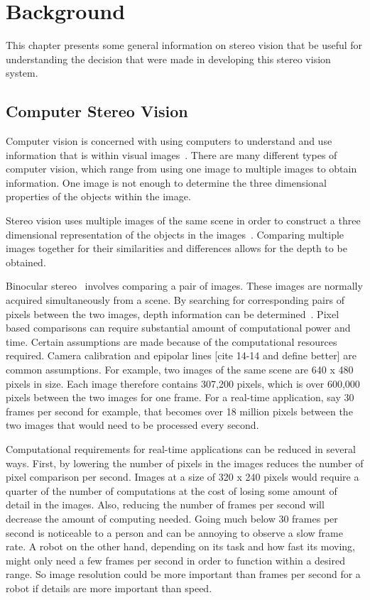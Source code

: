 \chapter{Background}
\label{bckgrnd}

This chapter presents some general information on stereo vision that be useful for understanding the decision that were made in developing this stereo vision system.

\section{Computer Stereo Vision}

Computer vision is concerned with using computers to understand and use information that is within visual images~\cite{computerVision}. There are many different types of computer vision, which range from using one image to multiple images to obtain information. One image is not enough to determine the three dimensional properties of the objects within the image.

Stereo vision uses multiple images of the same scene in order to construct a three dimensional representation of the objects in the images~\cite{stereoVision}. Comparing multiple images together for their similarities and differences allows for the depth to be obtained.

Binocular stereo~\cite{binocularStereo} involves comparing a pair of images. These images are normally acquired simultaneously from a scene. By searching for corresponding pairs of pixels between the two images, depth information can be determined~\cite{binocularStereo}. Pixel based comparisons can require substantial amount of computational power and time. Certain assumptions are made because of the computational resources required. Camera calibration and epipolar lines [cite 14-14 and define better] are common assumptions. For example, two images of the same scene are 640 x 480 pixels in size. Each image therefore contains 307,200 pixels, which is over 600,000 pixels between the two images for one frame. For a real-time application, say 30 frames per second for example, that becomes over 18 million pixels between the two images that would need to be processed every second.

Computational requirements for real-time applications can be reduced in several ways. First, by lowering the number of pixels in the images reduces the number of pixel comparison per second. Images at a size of 320 x 240 pixels would require a quarter of the number of computations at the cost of losing some amount of detail in the images. Also, reducing the number of frames per second will decrease the amount of computing needed. Going much below 30 frames per second is noticeable to a person and can be annoying to observe a slow frame rate. A robot on the other hand, depending on its task and how fast its moving, might only need a few frames per second in order to function within a desired range. So image resolution could be more important than frames per second for a robot if details are more important than speed.

